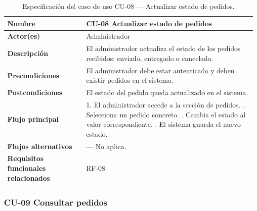 \begin{table}[H]
\centering
\small
\begin{tabular}{|m{}|m{}|}
\hline
\textbf{Nombre} & CU-08 Actualizar estado de pedidos \\ \hline
\textbf{Actor(es)} & Administrador \\ \hline
\textbf{Descripción} & El administrador actualiza el estado de los pedidos recibidos: enviado, entregado o cancelado. \\ \hline
\textbf{Precondiciones} & El administrador debe estar autenticado y deben existir pedidos en el sistema. \\ \hline
\textbf{Postcondiciones} & El estado del pedido queda actualizado en el sistema. \\ \hline
\textbf{Flujo principal} & 1. El administrador accede a la sección de pedidos. \newline 2. Selecciona un pedido concreto. \newline 3. Cambia el estado al valor correspondiente. \newline 4. El sistema guarda el nuevo estado. \\ \hline
\textbf{Flujos alternativos} & — No aplica. \\ \hline
\textbf{Requisitos funcionales relacionados} & RF-08 \\ \hline
\end{tabular}
\caption{Especificación del caso de uso CU-08 — Actualizar estado de pedidos.}
\end{table}

\clearpage

\subsubsection{CU-09 Consultar pedidos}

